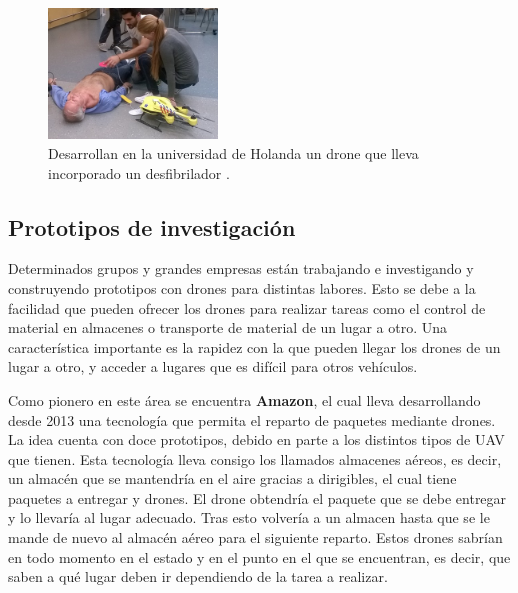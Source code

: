 \begin{figure}[H]
	\centering
		\includegraphics[width=0.4\textwidth]{imgs/drone_desfibrilador.jpg}
		\caption{Desarrollan en la universidad de Holanda un drone que lleva incorporado un desfibrilador .}
	\label{fig: Drone con desfibrilador para emergencias.}
\end{figure} 



\subsection{Prototipos de investigaci\'on }
\hspace{1 cm} Determinados grupos y grandes empresas est\'an trabajando e investigando y construyendo prototipos con drones para distintas labores. Esto se debe a la facilidad que pueden ofrecer los drones para realizar tareas como el control de material en almacenes o transporte de material de un lugar a otro. Una caracter\'istica importante es la rapidez con la que pueden llegar los drones de un lugar a otro, y acceder a lugares que es dif\'icil para otros veh\'iculos. 


\hspace{1 cm} Como pionero en este \'area se encuentra \textbf{Amazon}, el cual lleva desarrollando desde 2013 una tecnolog\'ia que permita el reparto de paquetes mediante drones. La idea cuenta con doce prototipos, debido en parte a los distintos tipos de UAV que tienen.  Esta tecnolog\'ia lleva consigo los llamados almacenes a\'ereos, es decir, un almac\'en que se mantendr\'ia en el aire gracias a dirigibles, el cual tiene paquetes a entregar y drones. El drone obtendr\'ia el paquete que se debe entregar y lo llevar\'ia al lugar adecuado. Tras esto volver\'ia a un almacen hasta que se le mande de nuevo al almac\'en a\'ereo para el siguiente reparto. Estos drones sabr\'ian en todo momento en el estado y en el punto en el que se encuentran, es decir, que saben a qu\'e lugar deben ir dependiendo de la tarea a realizar. 

